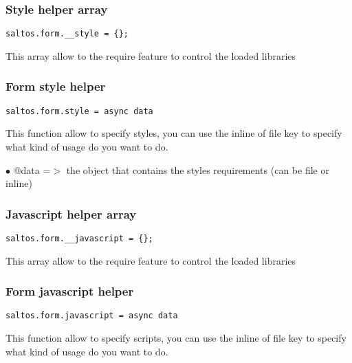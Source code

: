 \documentclass[a4paper]{article}
\begin{document}
\hypertarget{toc784}{}
\subsubsection{Style helper array}

\begin{lstlisting}
saltos.form.__style = {};
\end{lstlisting}

This array allow to the require feature to control the loaded libraries

\hypertarget{toc785}{}
\subsubsection{Form style helper}

\begin{lstlisting}
saltos.form.style = async data
\end{lstlisting}

This function allow to specify styles, you can use the inline of file key to specify
what kind of usage do you want to do.

\begin{compactitem}
\item[\color{myblue}$\bullet$] @data =$>$ the object that contains the styles requirements (can be file or inline)
\end{compactitem}

\hypertarget{toc786}{}
\subsubsection{Javascript helper array}

\begin{lstlisting}
saltos.form.__javascript = {};
\end{lstlisting}

This array allow to the require feature to control the loaded libraries

\hypertarget{toc787}{}
\subsubsection{Form javascript helper}

\begin{lstlisting}
saltos.form.javascript = async data
\end{lstlisting}

This function allow to specify scripts, you can use the inline of file key to specify
what kind of usage do you want to do.
\end{document}
